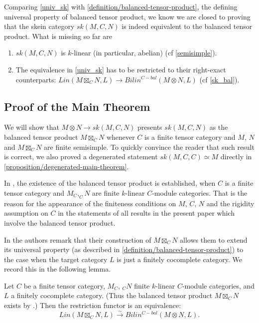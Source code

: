 \begin{remark}
  Comparing \ref{univ_sk} with \ref{definition/balanced-tensor-product}, the
  defining universal property of balanced tensor product, we know we are
  closed to proving that the skein category $sk(M,C,N)$ is indeed equivalent
  to the balanced tensor product. What is missing so far are

  \begin{enumerate}
    \item $sk(M,C,N)$ is $k$-linear (in particular, abelian) (cf \ref{semisimple}).
    \item The equivalence in \ref{univ_sk} has to be restricted to their
          right-exact counterparts:
          $Lin(M \boxtimes_{C} N, L) \to Bilin^{C-bal}(M \otimes N, L)$ (cf \ref{sk_bal}).
  \end{enumerate}
\end{remark}

\subsection{Proof of the Main Theorem}

We will show that $M\otimes N\to sk(M,C,N)$ presents $sk(M,C,N)$ as the
balanced tensor product $M\boxtimes_C N$ whenever $C$ is a finite tensor
category and $M$, $N$ and $M\boxtimes_C N$ are finite semisimple. To quickly
convince the reader that such result is correct, we also proved a degenerated
statement $sk(M,C,C) \simeq M$ directly in \ref{proposition/degenerated-main-theorem}.

\begin{remark} In \cite{douglas/balanced-product}, the existence of the balanced tensor
product is established, when $C$ is a finite tensor category and $M_C,_{C}N$ 
are finite $k$-linear $C$-module categories. That is the reason for the appearance of the finiteness conditions
on $M$, $C$, $N$ and the rigidity assumption on $C$ in the statements of all results in
the present paper which involve the balanced tensor product.\end{remark}

In \cite{douglas/balanced-product} the authors remark that their construction of $M\boxtimes_C N$ 
allows them to extend its universal property (as described in \ref{definition/balanced-tensor-product})
to the case when the target category $L$ is just a finitely cocomplete category.
We record this in the following lemma.

\begin{lemma}\label{univ_box}

  \noindent
  Let $C$ be a finite tensor category, $M_C$, $_{C}N$ finite $k$-linear
  $C$-module categories, and $L$ a finitely cocomplete category. (Thus the
  balanced tensor product $M \boxtimes_C N$ exists by
  \cite{douglas/balanced-product}.) Then the restriction functor is an
  equivalence:
  \[Lin(M \boxtimes_{C} N, L) \xrightarrow{\sim} Bilin^{C-bal}(M \otimes N, L).\]
\end{lemma}

